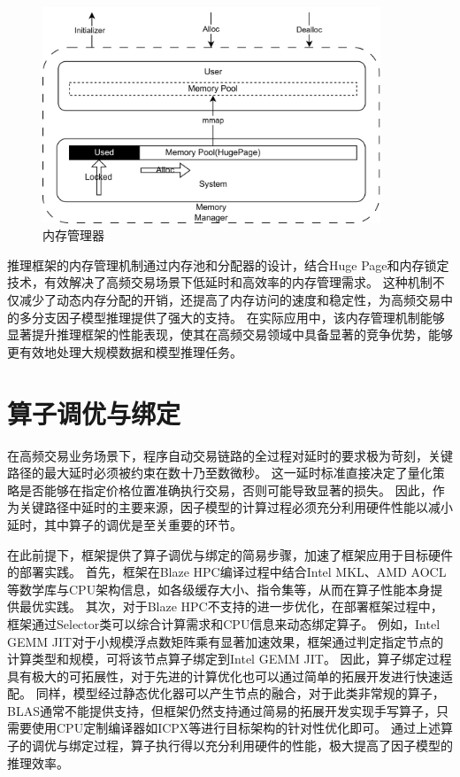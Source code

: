\begin{figure}[h]
    \centering
    \includegraphics[width=0.9\textwidth]{image/chap03/memmory.png}
    \caption{内存管理器}
    \label{fig:hole}
\end{figure}

推理框架的内存管理机制通过内存池和分配器的设计，结合Huge Page和内存锁定技术，有效解决了高频交易场景下低延时和高效率的内存管理需求。
这种机制不仅减少了动态内存分配的开销，还提高了内存访问的速度和稳定性，为高频交易中的多分支因子模型推理提供了强大的支持。
在实际应用中，该内存管理机制能够显著提升推理框架的性能表现，使其在高频交易领域中具备显著的竞争优势，能够更有效地处理大规模数据和模型推理任务。

\section{算子调优与绑定}
在高频交易业务场景下，程序自动交易链路的全过程对延时的要求极为苛刻，关键路径的最大延时必须被约束在数十乃至数微秒。
这一延时标准直接决定了量化策略是否能够在指定价格位置准确执行交易，否则可能导致显著的损失。
因此，作为关键路径中延时的主要来源，因子模型的计算过程必须充分利用硬件性能以减小延时，其中算子的调优是至关重要的环节。

在此前提下，框架提供了算子调优与绑定的简易步骤，加速了框架应用于目标硬件的部署实践。
首先，框架在Blaze HPC编译过程中结合Intel MKL、AMD AOCL等数学库与CPU架构信息，如各级缓存大小、指令集等，从而在算子性能本身提供最优实践。
其次，对于Blaze HPC不支持的进一步优化，在部署框架过程中，框架通过Selector类可以综合计算需求和CPU信息来动态绑定算子。
例如，Intel GEMM JIT对于小规模浮点数矩阵乘有显著加速效果，框架通过判定指定节点的计算类型和规模，可将该节点算子绑定到Intel GEMM JIT。
因此，算子绑定过程具有极大的可拓展性，对于先进的计算优化也可以通过简单的拓展开发进行快速适配。
同样，模型经过静态优化器可以产生节点的融合，对于此类非常规的算子，BLAS通常不能提供支持，但框架仍然支持通过简易的拓展开发实现手写算子，只需要使用CPU定制编译器如ICPX等进行目标架构的针对性优化即可。
通过上述算子的调优与绑定过程，算子执行得以充分利用硬件的性能，极大提高了因子模型的推理效率。

